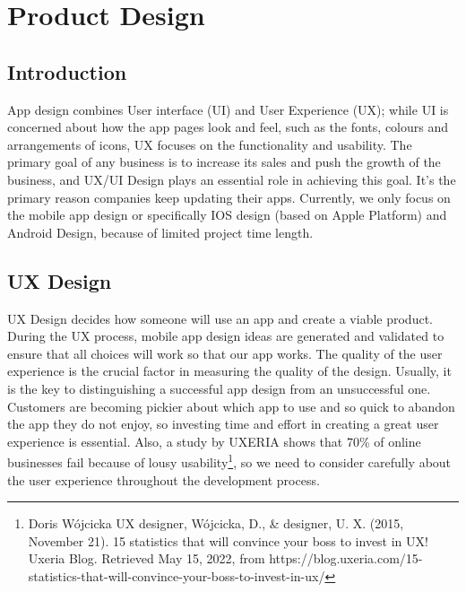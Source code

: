 \chapter{Product Design} %
\label{Chapter2} %

\section{Introduction}
App design combines User interface (UI) and User Experience (UX); while UI is concerned about how the app pages look and feel, such as the fonts, colours and arrangements of icons, UX focuses on the functionality and usability. The primary goal of any business is to increase its sales and push the growth of the business, and UX/UI Design plays an essential role in achieving this goal. It's the primary reason companies keep updating their apps. Currently, we only focus on the mobile app design or specifically IOS design (based on Apple Platform) and Android Design, because of limited project time length.
\section{UX Design}
UX Design decides how someone will use an app and create a viable product. 
During the UX process, mobile app design ideas are generated and validated to ensure that all choices will work so that our app works. 
The quality of the user experience is the crucial factor in measuring the quality of the design. 
Usually, it is the key to distinguishing a successful app design from an unsuccessful one. 
Customers are becoming pickier about which app to use and so quick to abandon the app they do not enjoy, so investing time and effort in creating a great user experience is essential. 
Also, a study by UXERIA shows that 70\% of online businesses fail because of lousy usability\footnote{Doris Wójcicka UX designer, Wójcicka, D., \& designer, U. X. (2015, November 21). 15 statistics that will convince your boss to invest in UX! Uxeria Blog. Retrieved May 15, 2022, from https://blog.uxeria.com/15-statistics-that-will-convince-your-boss-to-invest-in-ux/ }, so we need to consider carefully about the user experience throughout the development process.
